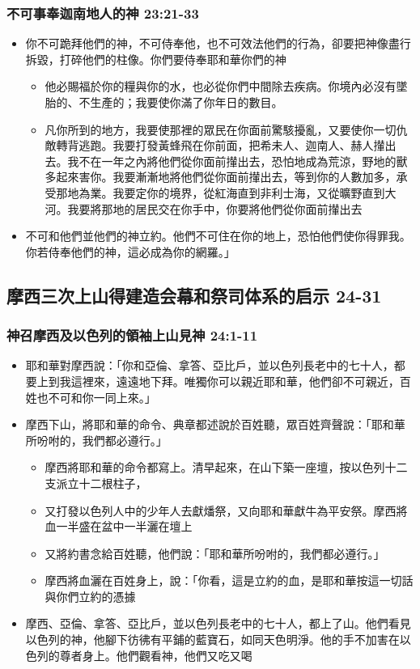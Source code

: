 \subsubsection{不可事奉迦南地人的神 23:21-33}
\begin{itemize} 
\itemsep-.35em
\item 你不可跪拜他們的神，不可侍奉他，也不可效法他們的行為，卻要把神像盡行拆毀，打碎他們的柱像。你們要侍奉耶和華你們的神
\begin{itemize} 
\itemsep-.35em
\item 他必賜福於你的糧與你的水，也必從你們中間除去疾病。你境內必沒有墜胎的、不生產的；我要使你滿了你年日的數目。
\item 凡你所到的地方，我要使那裡的眾民在你面前驚駭擾亂，又要使你一切仇敵轉背逃跑。我要打發黃蜂飛在你前面，把希未人、迦南人、赫人攆出去。我不在一年之內將他們從你面前攆出去，恐怕地成為荒涼，野地的獸多起來害你。我要漸漸地將他們從你面前攆出去，等到你的人數加多，承受那地為業。我要定你的境界，從紅海直到非利士海，又從曠野直到大河。我要將那地的居民交在你手中，你要將他們從你面前攆出去
\end{itemize}
\item 不可和他們並他們的神立約。他們不可住在你的地上，恐怕他們使你得罪我。你若侍奉他們的神，這必成為你的網羅。」
\end{itemize}


\subsection{摩西三次上山得建造会幕和祭司体系的启示 24-31}
\subsubsection{神召摩西及以色列的領袖上山見神 24:1-11}
\begin{itemize} 
\itemsep-.35em
\item 耶和華對摩西說：「你和亞倫、拿答、亞比戶，並以色列長老中的七十人，都要上到我這裡來，遠遠地下拜。唯獨你可以親近耶和華，他們卻不可親近，百姓也不可和你一同上來。」 
\item 摩西下山，將耶和華的命令、典章都述說於百姓聽，眾百姓齊聲說：「耶和華所吩咐的，我們都必遵行。」
\begin{itemize} 
\itemsep-.35em
\item 摩西將耶和華的命令都寫上。清早起來，在山下築一座壇，按以色列十二支派立十二根柱子， \item 又打發以色列人中的少年人去獻燔祭，又向耶和華獻牛為平安祭。摩西將血一半盛在盆中一半灑在壇上
\item 又將約書念給百姓聽，他們說：「耶和華所吩咐的，我們都必遵行。」 
\item 摩西將血灑在百姓身上，說：「你看，這是立約的血，是耶和華按這一切話與你們立約的憑據
\end{itemize}
\item 摩西、亞倫、拿答、亞比戶，並以色列長老中的七十人，都上了山。他們看見以色列的神，他腳下彷彿有平鋪的藍寶石，如同天色明淨。他的手不加害在以色列的尊者身上。他們觀看神，他們又吃又喝
\end{itemize}

